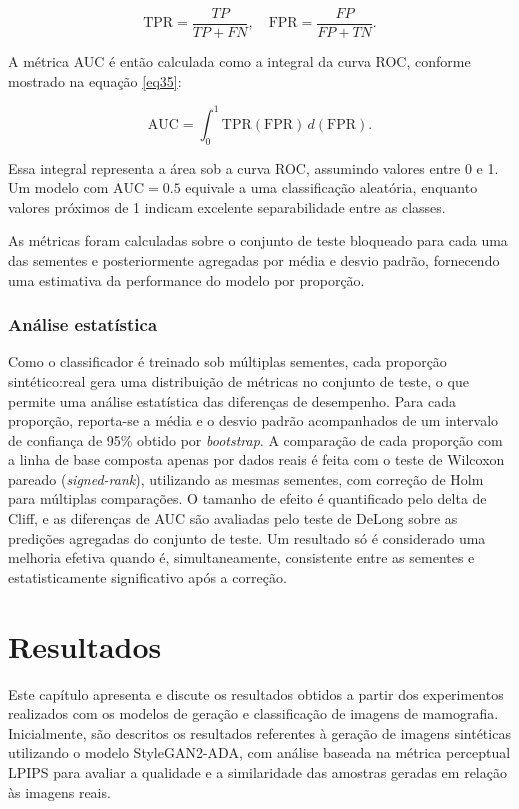\documentclass[
	12pt,				%
	openright,			%
	oneside,			%
	a4paper,			%
	tcc,			%
	]{ABNT-DC-UEL}
\begin{document}
\begin{equation}
\text{TPR} = \frac{TP}{TP + FN}, \quad
\text{FPR} = \frac{FP}{FP + TN}.
\label{eq34}
\end{equation}

A métrica AUC é então calculada como a integral da curva ROC, conforme mostrado na equação \eqref{eq35}:

\begin{equation}
\text{AUC} = \int_{0}^{1} \text{TPR}(\text{FPR}) \, d(\text{FPR}).
\label{eq35}
\end{equation}

Essa integral representa a área sob a curva ROC, assumindo valores entre 0 e 1. Um modelo com $\text{AUC} = 0.5$ equivale a uma classificação aleatória, enquanto valores próximos de 1 indicam excelente separabilidade entre as classes.

As métricas foram calculadas sobre o conjunto de teste bloqueado para cada uma das sementes e posteriormente agregadas por média e desvio padrão, fornecendo uma estimativa da performance do modelo por proporção.

\subsection{Análise estatística}
\label{sec:analise_estatistica}

Como o classificador é treinado sob múltiplas sementes, cada proporção sintético:real gera uma distribuição de métricas no conjunto de teste, o que permite uma análise estatística das diferenças de desempenho. Para cada proporção, reporta-se a média e o desvio padrão acompanhados de um intervalo de confiança de 95\% obtido por \textit{bootstrap}. A comparação de cada proporção com a linha de base composta apenas por dados reais é feita com o teste de Wilcoxon pareado (\textit{signed-rank}), utilizando as mesmas sementes, com correção de Holm para múltiplas comparações. O tamanho de efeito é quantificado pelo delta de Cliff, e as diferenças de AUC são avaliadas pelo teste de DeLong \cite{delong1988} sobre as predições agregadas do conjunto de teste. Um resultado só é considerado uma melhoria efetiva quando é, simultaneamente, consistente entre as sementes e estatisticamente significativo após a correção.


\chapter{Resultados}

Este capítulo apresenta e discute os resultados obtidos a partir dos experimentos realizados com os modelos de geração e classificação de imagens de mamografia. Inicialmente, são descritos os resultados referentes à geração de imagens sintéticas utilizando o modelo StyleGAN2-ADA, com análise baseada na métrica perceptual LPIPS para avaliar a qualidade e a similaridade das amostras geradas em relação às imagens reais.
\end{document}
